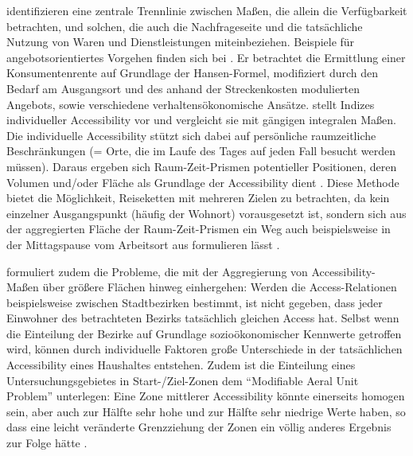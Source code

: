 \documentclass[11pt,pdftex,a4paper]{scrartcl}
\begin{document}
	\textcite[92]{morrisAccessibilityIndicatorsTransport1979} identifizieren eine zentrale Trennlinie zwischen Maßen, die allein die Verfügbarkeit betrachten, und solchen, die auch die Nachfrageseite und die tatsächliche Nutzung von Waren und Dienstleistungen miteinbeziehen. Beispiele für angebotsorientiertes Vorgehen finden sich bei \textcite{koenigIndicatorsUrbanAccessibility1980}. Er betrachtet die Ermittlung einer Konsumentenrente auf Grundlage der Hansen-Formel, modifiziert durch den Bedarf am Ausgangsort und des anhand der Streckenkosten modulierten Angebots, sowie verschiedene verhaltensökonomische Ansätze.
	\textcite{kwanSpaceTimeIntegralMeasures1998} stellt Indizes individueller Accessibility vor und vergleicht sie mit gängigen integralen Maßen. Die individuelle Accessibility stützt sich dabei auf persönliche raumzeitliche Beschränkungen (= Orte, die im Laufe des Tages auf jeden Fall besucht werden müssen). Daraus ergeben sich Raum-Zeit-Prismen potentieller Positionen, deren Volumen und/oder Fläche als Grundlage der Accessibility dient \parencite[zu diesem Konzept der Zeitgeographie ursprünglich][insbes. 13, Abbildung 1 und 14]{hagerstraandWhatPeopleRegional1970}. Diese Methode bietet die Möglichkeit, Reiseketten mit mehreren Zielen zu betrachten, da kein einzelner Ausgangspunkt (häufig der Wohnort) vorausgesetzt ist, sondern sich aus der aggregierten Fläche der Raum-Zeit-Prismen ein Weg auch beispielsweise in der Mittagspause vom Arbeitsort aus formulieren lässt \parencite[196]{kwanSpaceTimeIntegralMeasures1998}.
	
	\label{par:MAUP}\textcite[195]{kwanSpaceTimeIntegralMeasures1998} formuliert zudem die Probleme, die mit der Aggregierung von Accessibility-Maßen über größere Flächen hinweg einhergehen: Werden die Access-Relationen beispielsweise zwischen Stadtbezirken bestimmt, ist nicht gegeben, dass jeder Einwohner des betrachteten Bezirks tatsächlich gleichen Access hat. Selbst wenn die Einteilung der Bezirke auf Grundlage sozioökonomischer Kennwerte getroffen wird, können durch individuelle Faktoren große Unterschiede in der tatsächlichen Accessibility eines Haushaltes entstehen. Zudem ist die Einteilung eines Untersuchungsgebietes in Start-/Ziel-Zonen dem \enquote{Modifiable Aeral Unit Problem} unterlegen: Eine Zone mittlerer Accessibility könnte einerseits homogen sein, aber auch zur Hälfte sehr hohe und zur Hälfte sehr niedrige Werte haben, so dass eine leicht veränderte Grenzziehung der Zonen ein völlig anderes Ergebnis zur Folge hätte \parencites[195]{kwanSpaceTimeIntegralMeasures1998}[ausführliche Beschreibung bei][insbes. 8]{openshawModifiableArealUnit1984}{gehlkeCertainEffectsGrouping1934}[vgl. auch][8]{conwayEvidenceBasedTransitLand2017}.
	 
\end{document}
